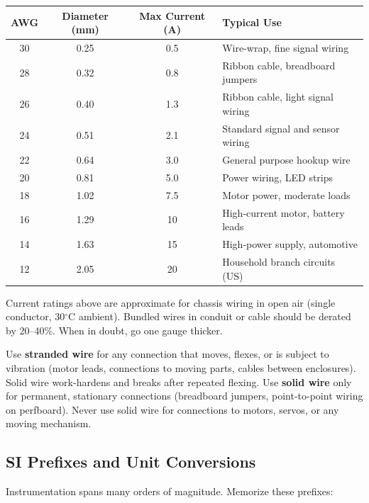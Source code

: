 \documentclass[11pt,letterpaper,twoside,openany]{book}
\newcommand{\degC}{\ensuremath{{}^{\circ}\text{C}}}
\begin{document}
\begin{center}
\begin{tabular}{cccl}
\toprule
\textbf{AWG} & \textbf{Diameter (mm)} & \textbf{Max Current (A)} & \textbf{Typical Use} \\
\midrule
30 & 0.25 & 0.5  & Wire-wrap, fine signal wiring \\
28 & 0.32 & 0.8  & Ribbon cable, breadboard jumpers \\
26 & 0.40 & 1.3  & Ribbon cable, light signal wiring \\
24 & 0.51 & 2.1  & Standard signal and sensor wiring \\
22 & 0.64 & 3.0  & General purpose hookup wire \\
20 & 0.81 & 5.0  & Power wiring, LED strips \\
18 & 1.02 & 7.5  & Motor power, moderate loads \\
16 & 1.29 & 10   & High-current motor, battery leads \\
14 & 1.63 & 15   & High-power supply, automotive \\
12 & 2.05 & 20   & Household branch circuits (US) \\
\bottomrule
\end{tabular}
\end{center}

Current ratings above are approximate for chassis wiring in open air (single conductor, 30\degC{} ambient). Bundled wires in conduit or cable should be derated by 20--40\%. When in doubt, go one gauge thicker.

\begin{warningbox}
Use \textbf{stranded wire} for any connection that moves, flexes, or is subject to vibration (motor leads, connections to moving parts, cables between enclosures). Solid wire work-hardens and breaks after repeated flexing. Use \textbf{solid wire} only for permanent, stationary connections (breadboard jumpers, point-to-point wiring on perfboard). Never use solid wire for connections to motors, servos, or any moving mechanism.
\end{warningbox}

\subsection{SI Prefixes and Unit Conversions}
Instrumentation spans many orders of magnitude. Memorize these prefixes:
\end{document}

